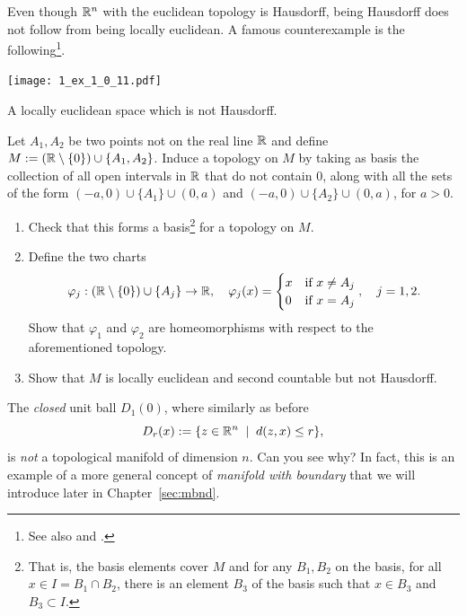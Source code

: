 \begin{exercise}
	Even though $\mathbb{R}^n$ with the euclidean topology is Hausdorff, being Hausdorff does not follow from being locally euclidean. A famous counterexample is the following\footnote{See also \cite[Problem 1-1]{book:lee} and \cite[Problem 5.1]{book:tu}.}.
  \begin{marginfigure}
    \texttt{[image: 1\_ex\_1\_0\_11.pdf]}
    \label{fig:hausdorff-not-locally-euclidean}
    \caption{A locally euclidean space which is not Hausdorff.}
  \end{marginfigure}
  Let $A_1, A_2$ be two points not on the real line $\mathbb{R}$ and define $M:= (\mathbb{R}\setminus\{0\})\cup\{A_1,A_2\}$.
  Induce a topology on $M$ by taking as basis the collection of all open intervals in $\mathbb{R}$ that do not contain $0$, along with all the sets of the form $(-a, 0)\cup\{A_1\}\cup(0,a)$ and $(-a, 0)\cup\{A_2\}\cup(0,a)$, for $a>0$.
  \begin{enumerate}
    \item Check that this forms a basis\footnote{That is, the basis elements cover $M$ and for any $B_1, B_2$ on the basis, for all $x \in I = B_1\cap B_2$, there is an element $B_3$ of the basis such that $x\in B_3$ and $B_3\subset I$.} for a topology on $M$.
    \item Define the two charts
    \begin{equation}
    \varphi_j:(\mathbb{R}\setminus\{0\})\cup\{A_j\} \to \mathbb{R}, \quad
    \varphi_j(x) = \begin{cases} x &\mbox{if } x\neq A_j\\ 0 & \mbox{if } x = A_j \end{cases}, \quad
    j = 1,2.
    \end{equation}
    Show that $\varphi_1$ and $\varphi_2$ are homeomorphisms with respect to the aforementioned topology. 
    \item Show that $M$ is locally euclidean and second countable but not Hausdorff.
  \end{enumerate}
\end{exercise}

\begin{example}\label{ex:uball}
  The \emph{closed} unit ball $D_1(0)$, where similarly as before
  \begin{equation}
    D_r(x) := \{z\in\mathbb{R}^n \;\mid\; d(z,x) \leq r\},
  \end{equation}
  is \emph{not} a topological manifold of dimension $n$. Can you see why? In fact, this is an example of a more general concept of \emph{manifold with boundary} that we will introduce later in Chapter~\ref{sec:mbnd}.
\end{example}

